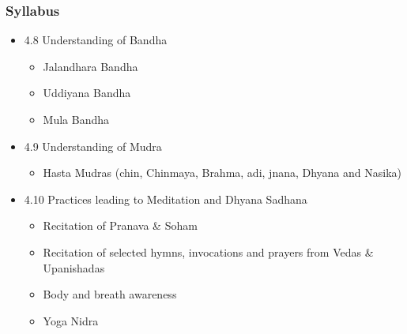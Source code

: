 \begin{frame}[fragile]\frametitle{Syllabus}

\begin{itemize}
\item 4.8  Understanding of Bandha  
	\begin{itemize}
	\item Jalandhara Bandha 
	\item Uddiyana Bandha  
	\item Mula Bandha 
	\end{itemize}

\item 4.9    Understanding of Mudra   
	\begin{itemize}
	\item Hasta Mudras (chin, Chinmaya, Brahma, adi, jnana, Dhyana and Nasika) 
	\end{itemize}
	
\item 4.10  Practices leading to Meditation and Dhyana Sadhana   
	\begin{itemize}
	\item  Recitation of Pranava \& Soham 
	\item  Recitation of selected hymns, invocations and prayers from Vedas \& Upanishadas 
	\item  Body and breath awareness  
	\item  Yoga Nidra 
	\end{itemize}
	
\end{itemize}
\end{frame}
